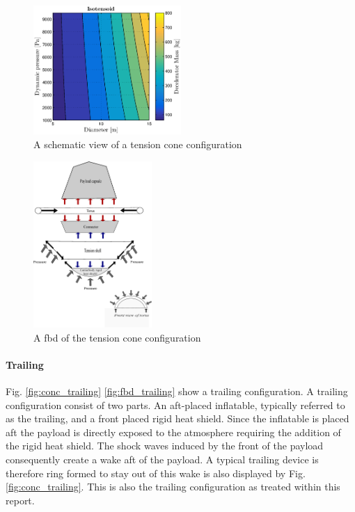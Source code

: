 \begin{figure}[H]
\centering
\includegraphics[width = 0.5\textwidth]{Figure/ISO_comp.eps}
\caption{A schematic view of a tension cone configuration}
\label{fig:conc_tension}
\end{figure}

\begin{figure}[H]
\centering
\includegraphics[width = 0.4\textwidth]{Figure/FBD_tensioncone.eps}
\caption{A \gls{fbd} of the tension cone configuration}
\label{fig:fbd_tension}
\end{figure}

\paragraph{Trailing}

Fig. \ref{fig:conc_trailing} \ref{fig:fbd_trailing} show a trailing configuration. A trailing configuration consist of two parts. An aft-placed inflatable, typically referred to as the trailing, and a front placed rigid heat shield. Since the inflatable is placed aft the payload is directly exposed to the atmosphere requiring the addition of the rigid heat shield. The shock waves induced by the front of the payload consequently create a wake aft of the payload. A typical trailing device is therefore ring formed to stay out of this wake is also displayed by Fig. \ref{fig:conc_trailing}. This is also the trailing configuration as treated within this report.

